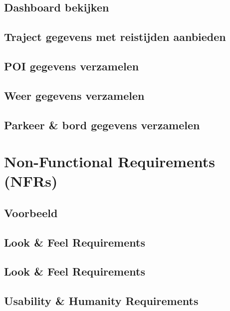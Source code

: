 \documentclass[a4paper]{article}
\begin{document}
\subsection{Dashboard bekijken}
\newpage

\subsection{Traject gegevens met reistijden aanbieden}
\newpage

\subsection{POI gegevens verzamelen}
\newpage

\subsection{Weer gegevens verzamelen}
\newpage

\subsection{Parkeer \& bord gegevens verzamelen}
\newpage

\section{Non-Functional Requirements (NFRs)}
\subsection{Voorbeeld}

\subsection{Look \& Feel Requirements}

\subsection{Look \& Feel Requirements}

\subsection{Usability \& Humanity Requirements}
\end{document}
